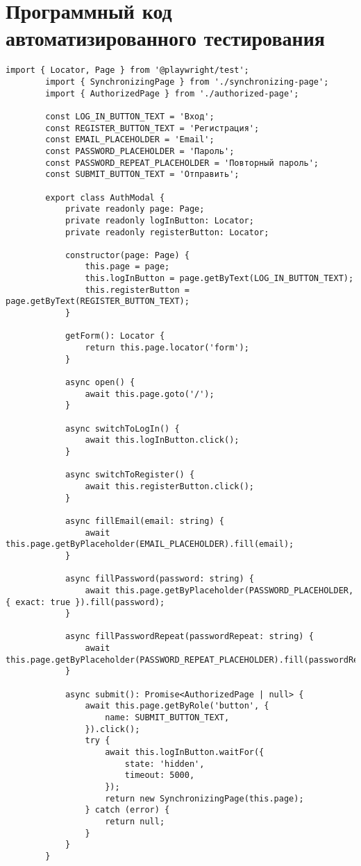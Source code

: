 \chapter{Программный код автоматизированного тестирования}
\label{chap:autotests_code}

	\begin{lstlisting}[caption={pages/auth-modal.ts}]
		import { Locator, Page } from '@playwright/test';
		import { SynchronizingPage } from './synchronizing-page';
		import { AuthorizedPage } from './authorized-page';
		
		const LOG_IN_BUTTON_TEXT = 'Вход';
		const REGISTER_BUTTON_TEXT = 'Регистрация';
		const EMAIL_PLACEHOLDER = 'Email';
		const PASSWORD_PLACEHOLDER = 'Пароль';
		const PASSWORD_REPEAT_PLACEHOLDER = 'Повторный пароль';
		const SUBMIT_BUTTON_TEXT = 'Отправить';
		
		export class AuthModal {
			private readonly page: Page;
			private readonly logInButton: Locator;
			private readonly registerButton: Locator;
			
			constructor(page: Page) {
				this.page = page;
				this.logInButton = page.getByText(LOG_IN_BUTTON_TEXT);
				this.registerButton = page.getByText(REGISTER_BUTTON_TEXT);
			}
			
			getForm(): Locator {
				return this.page.locator('form');
			}
			
			async open() {
				await this.page.goto('/');
			}
			
			async switchToLogIn() {
				await this.logInButton.click();
			}
			
			async switchToRegister() {
				await this.registerButton.click();
			}
			
			async fillEmail(email: string) {
				await this.page.getByPlaceholder(EMAIL_PLACEHOLDER).fill(email);
			}
			
			async fillPassword(password: string) {
				await this.page.getByPlaceholder(PASSWORD_PLACEHOLDER, { exact: true }).fill(password);
			}
			
			async fillPasswordRepeat(passwordRepeat: string) {
				await this.page.getByPlaceholder(PASSWORD_REPEAT_PLACEHOLDER).fill(passwordRepeat);
			}
			
			async submit(): Promise<AuthorizedPage | null> {
				await this.page.getByRole('button', {
					name: SUBMIT_BUTTON_TEXT,
				}).click();
				try {
					await this.logInButton.waitFor({
						state: 'hidden',
						timeout: 5000,
					});
					return new SynchronizingPage(this.page);
				} catch (error) {
					return null;
				}
			}
		}
	\end{lstlisting}

